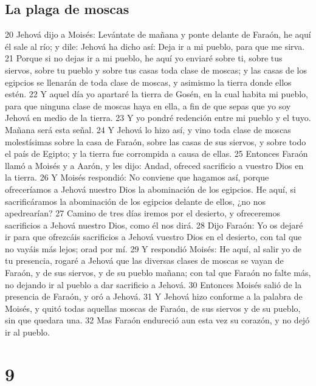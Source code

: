 \section{La plaga de moscas}
20 Jehová dijo a Moisés: Levántate de mañana y ponte delante de Faraón, he aquí él sale al río; y dile: Jehová ha dicho así: Deja ir a mi pueblo, para que me sirva.
21 Porque si no dejas ir a mi pueblo, he aquí yo enviaré sobre ti, sobre tus siervos, sobre tu pueblo y sobre tus casas toda clase de moscas; y las casas de los egipcios se llenarán de toda clase de moscas, y asimismo la tierra donde ellos estén.
22 Y aquel día yo apartaré la tierra de Gosén, en la cual habita mi pueblo, para que ninguna clase de moscas haya en ella, a fin de que sepas que yo soy Jehová en medio de la tierra.
23 Y yo pondré redención entre mi pueblo y el tuyo. Mañana será esta señal.
24 Y Jehová lo hizo así, y vino toda clase de moscas molestísimas sobre la casa de Faraón, sobre las casas de sus siervos, y sobre todo el país de Egipto; y la tierra fue corrompida a causa de ellas.
25 Entonces Faraón llamó a Moisés y a Aarón, y les dijo: Andad, ofreced sacrificio a vuestro Dios en la tierra.
26 Y Moisés respondió: No conviene que hagamos así, porque ofreceríamos a Jehová nuestro Dios la abominación de los egipcios. He aquí, si sacrificáramos la abominación de los egipcios delante de ellos, ¿no nos apedrearían?
27 Camino de tres días iremos por el desierto, y ofreceremos sacrificios a Jehová nuestro Dios, como él nos dirá.
28 Dijo Faraón: Yo os dejaré ir para que ofrezcáis sacrificios a Jehová vuestro Dios en el desierto, con tal que no vayáis más lejos; orad por mí.
29 Y respondió Moisés: He aquí, al salir yo de tu presencia, rogaré a Jehová que las diversas clases de moscas se vayan de Faraón, y de sus siervos, y de su pueblo mañana; con tal que Faraón no falte más, no dejando ir al pueblo a dar sacrificio a Jehová.
30 Entonces Moisés salió de la presencia de Faraón, y oró a Jehová.
31 Y Jehová hizo conforme a la palabra de Moisés, y quitó todas aquellas moscas de Faraón, de sus siervos y de su pueblo, sin que quedara una.
32 Mas Faraón endureció aun esta vez su corazón, y no dejó ir al pueblo.

\chapter{9}

